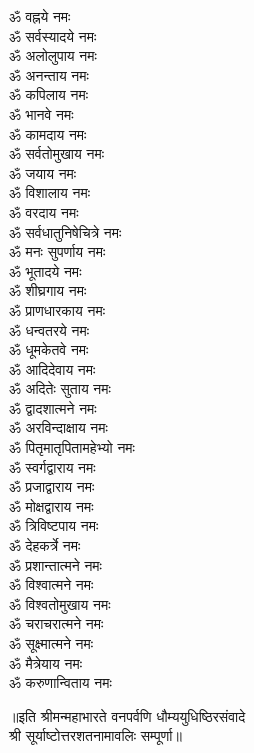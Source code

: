 \begin{multicols}{2}
\begin{flushleft}
        ॐ वह्नये नमः\\
        ॐ सर्वस्यादये नमः\\
        ॐ अलोलुपाय नमः\\
        ॐ अनन्ताय नमः\\
        ॐ कपिलाय नमः\hfill{}\\
        ॐ भानवे नमः\\
        ॐ कामदाय नमः\\
        ॐ सर्वतोमुखाय नमः\\
        ॐ जयाय नमः\\
        ॐ विशालाय नमः\\
        ॐ वरदाय नमः\\
        ॐ सर्वधातुनिषेचित्रे नमः\\
        ॐ मनः सुपर्णाय नमः\\
        ॐ भूतादये नमः\\
        ॐ शीघ्रगाय नमः\hfill{}\\
        ॐ प्राणधारकाय नमः\\
        ॐ धन्वतरये नमः\\
        ॐ धूमकेतवे नमः\\
        ॐ आदिदेवाय नमः\\
        ॐ अदितेः सुताय नमः\\
        ॐ द्वादशात्मने नमः\\
        ॐ अरविन्दाक्षाय नमः\\
        ॐ पितृमातृपितामहेभ्यो नमः\\
        ॐ स्वर्गद्वाराय नमः\\
        ॐ प्रजाद्वाराय नमः\hfill{}\\
        ॐ मोक्षद्वाराय नमः\\
        ॐ त्रिविष्टपाय नमः\\
        ॐ देहकर्त्रे नमः\\
        ॐ प्रशान्तात्मने नमः\\
        ॐ विश्वात्मने नमः\\
        ॐ विश्वतोमुखाय नमः\\
        ॐ चराचरात्मने नमः\\
        ॐ सूक्ष्मात्मने नमः\\
        ॐ मैत्रेयाय नमः\\
        ॐ करुणान्विताय नमः\hfill{}\\
    \end{flushleft}
\end{multicols}
॥इति श्रीमन्महाभारते वनपर्वणि धौम्ययुधिष्ठिरसंवादे\\श्री सूर्याष्टोत्तरशतनामावलिः सम्पूर्णा॥
